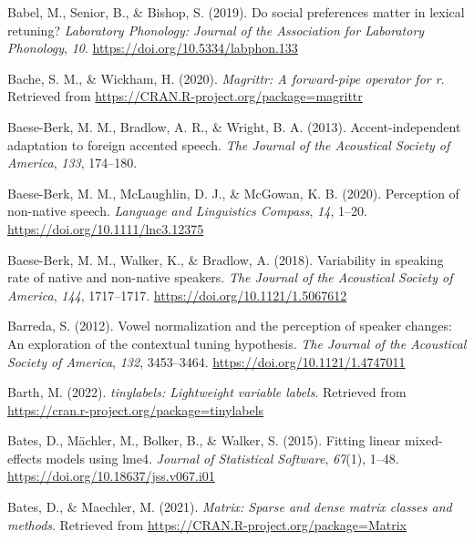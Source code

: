 \documentclass[
  11pt,
  man,floatsintext]{apa6}
\newlength{\cslhangindent}
\newlength{\cslentryspacingunit} %
\newenvironment{CSLReferences}[2] %
 {%
  \setlength{\parindent}{0pt}
  \ifodd #1
  \let\oldpar\par
  \def\par{\hangindent=\cslhangindent\oldpar}
  \fi
  \setlength{\parskip}{#2\cslentryspacingunit}
 }%
 {}
\begin{document}
\begin{CSLReferences}{1}{0}
\leavevmode{}%
Babel, M., Senior, B., \& Bishop, S. (2019). Do social preferences matter in lexical retuning? \emph{Laboratory Phonology: Journal of the Association for Laboratory Phonology}, \emph{10}. \url{https://doi.org/10.5334/labphon.133}

\leavevmode{}%
Bache, S. M., \& Wickham, H. (2020). \emph{Magrittr: A forward-pipe operator for r}. Retrieved from \url{https://CRAN.R-project.org/package=magrittr}

\leavevmode{}%
Baese-Berk, M. M., Bradlow, A. R., \& Wright, B. A. (2013). Accent-independent adaptation to foreign accented speech. \emph{The Journal of the Acoustical Society of America}, \emph{133}, 174--180.

\leavevmode{}%
Baese-Berk, M. M., McLaughlin, D. J., \& McGowan, K. B. (2020). Perception of non-native speech. \emph{Language and Linguistics Compass}, \emph{14}, 1--20. \url{https://doi.org/10.1111/lnc3.12375}

\leavevmode{}%
Baese-Berk, M. M., Walker, K., \& Bradlow, A. (2018). Variability in speaking rate of native and non-native speakers. \emph{The Journal of the Acoustical Society of America}, \emph{144}, 1717--1717. \url{https://doi.org/10.1121/1.5067612}

\leavevmode{}%
Barreda, S. (2012). Vowel normalization and the perception of speaker changes: An exploration of the contextual tuning hypothesis. \emph{The Journal of the Acoustical Society of America}, \emph{132}, 3453--3464. \url{https://doi.org/10.1121/1.4747011}

\leavevmode{}%
Barth, M. (2022). \emph{{tinylabels}: Lightweight variable labels}. Retrieved from \url{https://cran.r-project.org/package=tinylabels}

\leavevmode{}%
Bates, D., Mächler, M., Bolker, B., \& Walker, S. (2015). Fitting linear mixed-effects models using {lme4}. \emph{Journal of Statistical Software}, \emph{67}(1), 1--48. \url{https://doi.org/10.18637/jss.v067.i01}

\leavevmode{}%
Bates, D., \& Maechler, M. (2021). \emph{Matrix: Sparse and dense matrix classes and methods}. Retrieved from \url{https://CRAN.R-project.org/package=Matrix}


\end{CSLReferences}
\end{document}
